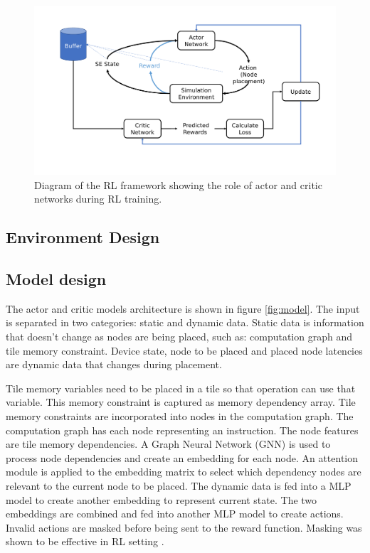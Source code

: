 \begin{figure}[h]
  \centering
  \includegraphics[width=\linewidth]{fig/ppo.pdf}
  \caption{Diagram of the RL framework showing the role of actor and critic networks during RL training. }
  \label{fig:ppo}
\end{figure}

\subsection{Environment Design}

\subsection{Model design}

The actor and critic models architecture is shown in figure \ref{fig:model}. 
The input is separated in two categories: static and dynamic data. 
Static data is information that doesn't change as nodes are being placed, such as: computation graph and tile memory constraint.
Device state, node to be placed and placed node latencies are dynamic data that changes during placement.

Tile memory variables need to be placed in a tile so that operation can use that variable. 
This memory constraint is captured as memory dependency array. 
Tile memory constraints are incorporated into nodes in the computation graph. 
The computation graph has each node representing an instruction. 
The node features are tile memory dependencies. 
A Graph Neural Network (GNN) is used to process node dependencies and create an embedding for each node. 
An attention module is applied to the embedding matrix to select which dependency nodes are relevant to the current node to be placed. The dynamic data is fed into a MLP model to 
create another embedding to represent current state. 
The two embeddings are combined and fed into another MLP model to 
create actions. 
Invalid actions are masked before being sent to the reward function. Masking was shown to be effective in RL setting \cite{Shengyi_mask}.

